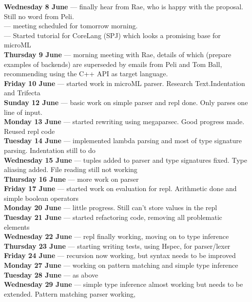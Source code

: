\textbf{Wednesday 8 June}  --- finally hear from Rae, who is happy with the proposal. Still no word from Peli. \\
\textbf{}  --- meeting scheduled for tomorrow morning. \\
\textbf{}  --- Started tutorial for CoreLang (SPJ) which looks a promising base for microML \\
\textbf{Thursday 9 June}  --- morning meeting with Rae, details of which (prepare examples of
backends) are superseded by emails from Peli and Tom Ball, recommending using the C++ API as target language. \\
\textbf{Friday 10 June}  --- started work in microML parser. Research Text.Indentation and Trifecta \\
\textbf{Sunday 12 June}  --- basic work on simple parser and repl done. Only parses one line of input. \\
\textbf{Monday 13 June}  --- started rewriting using megaparsec. Good progress made. Reused repl code \\
\textbf{Tuesday 14 June}  --- implemented lambda parsing and most of type signature parsing. Indentation still to do \\
\textbf{Wednesday 15 June}  --- tuples added to parser and type signatures fixed. Type aliasing added. File reading still not working \\
\textbf{Thursday 16 June}  --- more work on parser \\
\textbf{Friday 17 June}  --- started work on evaluation for repl. Arithmetic done and simple boolean operators \\
\textbf{Monday 20 June}  --- little progress. Still can't store values in the repl \\
\textbf{Tuesday 21 June}  --- started refactoring code, removing all problematic elements \\
\textbf{Wednesday 22 June}  --- repl finally working, moving on to type inference \\
\textbf{Thursday 23 June}  --- starting writing tests, using Hspec, for parser/lexer \\
\textbf{Friday 24 June}  --- recursion now working, but syntax needs to be improved \\
\textbf{Monday 27 June}  --- working on pattern matching and simple type inference \\
\textbf{Tuesday 28 June}  --- as above \\
\textbf{Wednesday 29 June}  --- simple type inference almost working but needs to be extended. Pattern matching parser working, \\
